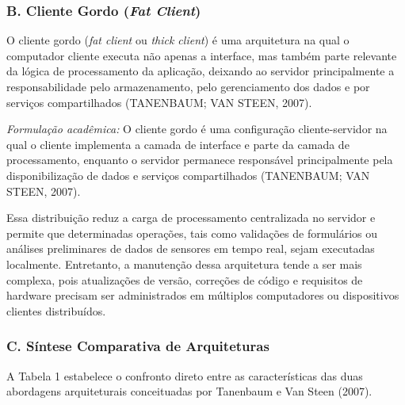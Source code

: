 \subsubsection*{B. Cliente Gordo (\textit{Fat Client})}

O cliente gordo (\textit{fat client} ou \textit{thick client}) é uma arquitetura na qual o computador cliente executa não apenas a interface, mas também parte relevante da lógica de processamento da aplicação, deixando ao servidor principalmente a responsabilidade pelo armazenamento, pelo gerenciamento dos dados e por serviços compartilhados (TANENBAUM; VAN STEEN, 2007).

\textit{Formulação acadêmica:} O cliente gordo é uma configuração cliente-servidor na qual o cliente implementa a camada de interface e parte da camada de processamento, enquanto o servidor permanece responsável principalmente pela disponibilização de dados e serviços compartilhados (TANENBAUM; VAN STEEN, 2007).

Essa distribuição reduz a carga de processamento centralizada no servidor e permite que determinadas operações, tais como validações de formulários ou análises preliminares de dados de sensores em tempo real, sejam executadas localmente. Entretanto, a manutenção dessa arquitetura tende a ser mais complexa, pois atualizações de versão, correções de código e requisitos de hardware precisam ser administrados em múltiplos computadores ou dispositivos clientes distribuídos.

\subsubsection*{C. Síntese Comparativa de Arquiteturas}

A Tabela 1 estabelece o confronto direto entre as características das duas abordagens arquiteturais conceituadas por Tanenbaum e Van Steen (2007).

